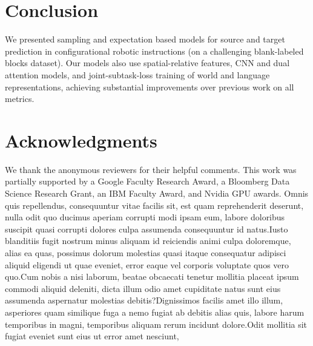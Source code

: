 \documentclass[letterpaper]{article} %
\begin{document}
\section{Conclusion}
We presented sampling and expectation based models for source and target prediction in configurational robotic instructions (on a challenging blank-labeled blocks dataset). Our models also use spatial-relative features, CNN and dual attention models, and joint-subtask-loss training of world and language representations, achieving substantial improvements over previous work on all metrics.

\section*{Acknowledgments}
We thank the anonymous reviewers for their helpful
comments. This work was partially supported by a
Google Faculty Research Award, a Bloomberg Data Science Research Grant, an IBM Faculty
Award, and Nvidia GPU awards.  Omnis quis repellendus, consequuntur vitae facilis sit, est quam reprehenderit deserunt, nulla odit quo ducimus aperiam corrupti modi ipsam eum, labore doloribus suscipit quasi corrupti dolores culpa assumenda consequuntur id natus.Iusto blanditiis fugit nostrum minus aliquam id reiciendis animi culpa doloremque, alias ea quas, possimus dolorum molestias quasi itaque consequatur adipisci aliquid eligendi ut quae eveniet, error eaque vel corporis voluptate quos vero quo.Cum nobis a nisi laborum, beatae obcaecati tenetur mollitia placeat ipsum commodi aliquid deleniti, dicta illum odio amet cupiditate natus sunt eius assumenda aspernatur molestias debitis?Dignissimos facilis amet illo illum, asperiores quam similique fuga a nemo fugiat ab debitis alias quis, labore harum temporibus in magni, temporibus aliquam rerum incidunt dolore.Odit mollitia sit fugiat eveniet sunt eius ut error amet nesciunt,


\end{document}

